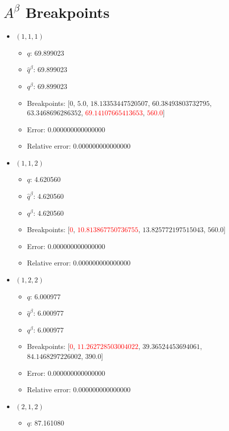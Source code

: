 \documentclass{article}%
\begin{document}
\section{$A^\beta$ Breakpoints}%
\thispagestyle{plain}%
\begin{itemize}%
	\item $(1, 1, 1)$%
	\begin{itemize}%
		\item $q$: 69.899023%
		\item $\hat{q}^\beta$: 69.899023%
		\item $q^\beta$: 69.899023%
		\item Breakpoints: $[$$0$, $5.0$, $18.13353447520507$, $60.38493803732795$, $63.3468696286352$, \textcolor{red}{$69.14107665413653$}, \textcolor{red}{$560.0$}$]$%
		\item Error: 0.000000000000000%
		\item Relative error: 0.000000000000000%
	\end{itemize}%
	\item $(1, 1, 2)$%
	\begin{itemize}%
		\item $q$: 4.620560%
		\item $\hat{q}^\beta$: 4.620560%
		\item $q^\beta$: 4.620560%
		\item Breakpoints: $[$\textcolor{red}{$0$}, \textcolor{red}{$10.813867750736755$}, $13.825772197515043$, $560.0$$]$%
		\item Error: 0.000000000000000%
		\item Relative error: 0.000000000000000%
	\end{itemize}%
	\item $(1, 2, 2)$%
	\begin{itemize}%
		\item $q$: 6.000977%
		\item $\hat{q}^\beta$: 6.000977%
		\item $q^\beta$: 6.000977%
		\item Breakpoints: $[$\textcolor{red}{$0$}, \textcolor{red}{$11.262728503004022$}, $39.36524453694061$, $84.1468297226002$, $390.0$$]$%
		\item Error: 0.000000000000000%
		\item Relative error: 0.000000000000000%
	\end{itemize}%
	\item $(2, 1, 2)$%
	\begin{itemize}%
		\item $q$: 87.161080%

\end{itemize}
\end{itemize}
\end{document}
